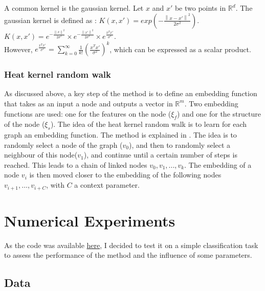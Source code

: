 \documentclass[a4paper,11pt]{article}
\begin{document}
A common kernel is the gaussian kernel. 
Let $x$ and $x'$ be two points in $\mathbb{R}^d$.
The gaussian kernel is defined as : $K(x, x') = exp(-\frac{\left\lVert x - x' \right\rVert ^2}{2\sigma^2})$.\\
$K(x, x') = e^{-\frac{\left\lVert x \right\rVert ^2}{2\sigma^2}} \times e^{-\frac{\left\lVert x' \right\rVert ^2}{2\sigma^2}} \times e^{ \frac{x^T x'}{\sigma^2}}$.\\
However, $e^{\frac{x^T x'}{\sigma^2}} = \sum_{k=0}^{\infty} \frac{1}{k!} \left( \frac{x^T x'}{\sigma^2} \right)^k$, which can be expressed as a scalar product. \\


\subsubsection{Heat kernel random walk}

As discussed above, a key step of the method is to define an embedding function that takes as an input a node and outputs a vector in $\mathbb{R}^m$.
Two embedding functions are used: one for the features on the node ($\xi_f$) and one for the structure of the node ($\xi_s$).
The idea of the heat kernel random walk is to learn for each graph an embedding function. 
The method is explained in \cite{abu2018watch}. 
The idea is to randomly select a node of the graph ($v_0$), and then to randomly select a neighbour of this node($v_1$), and continue until a certain number of steps is reached.
This leads to a chain of linked nodes $v_0, v_1, ..., v_k$.
The embedding of a node $v_i$ is then moved closer to the embedding of the following nodes $ v_{i+1}, \dots, v_{i+C} $, with $C$ a context parameter. 


\section{Numerical Experiments}

As the code was available \href{https://github.com/wokas36/RWK}{here}, I decided to test it on a simple classification task to assess the performance of the method and the influence of some parameters. 

\subsection{Data}
\end{document}

